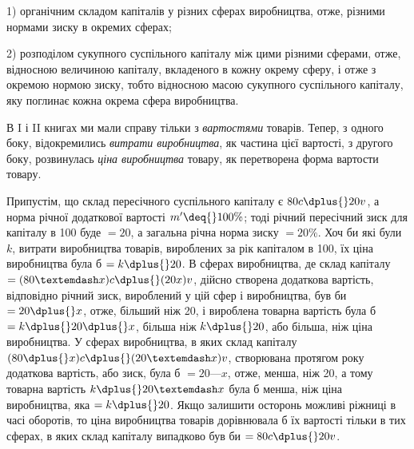 1) органічним складом капіталів у різних сферах виробництва,
отже, різними нормами зиску в окремих сферах;

2) розподілом сукупного суспільного капіталу між цими різними сферами, отже, відносною величиною
капіталу, вкладеного
в кожну окрему сферу, і отже з окремою нормою зиску, тобто
відносною масою сукупного суспільного капіталу, яку поглинає
кожна окрема сфера виробництва.

В I і II книгах ми мали справу тільки з \emph{вартостями} товарів.
Тепер, з одного боку, відокремились \emph{витрати виробництва}, як
частина цієї вартості, з другого боку, розвинулась \emph{ціна виробництва} товару, як перетворена форма
вартости товару.

Припустім, що склад пересічного суспільного капіталу є
$80 c \dplus{} 20 v$, а норма річної додаткової вартості $m' \deq{} 100\%$; тоді
річний пересічний зиск для капіталу в 100 буде $= 20$, а загальна
річна норма зиску $= 20\%$. Хоч би які були $k$, витрати виробництва
товарів, вироблених за рік капіталом в 100, їх ціна виробництва була б $= k \dplus{} 20$. В сферах
виробництва, де склад капіталу $= (80 — x) c \dplus{} (20 x) v$, дійсно створена додаткова вартість,
відповідно річний зиск, вироблений у цій сфер і виробництва,
був би $= 20 \dplus{} x$, отже, більший ніж 20, і вироблена
товарна вартість була б $= k \dplus{} 20 \dplus{} x$, більша ніж $k \dplus{} 20$, або
більша, ніж ціна виробництва. У сферах виробництва, в яких
склад капіталу $(80 \dplus{} x) c \dplus{} (20 — x) v$, створювана протягом року
додаткова вартість, або зиск, була б $= 20 — x$, отже, менша, ніж 20,
а тому товарна вартість $k \dplus{} 20 — x$ була б менша, ніж ціна виробництва, яка $= k \dplus{} 20$. Якщо залишити
осторонь можливі ріжниці в часі оборотів, то ціна виробництва товарів дорівнювала б їх вартості
тільки в тих сферах, в яких склад капіталу випадково був би $= 80 c \dplus{} 20 v$.

